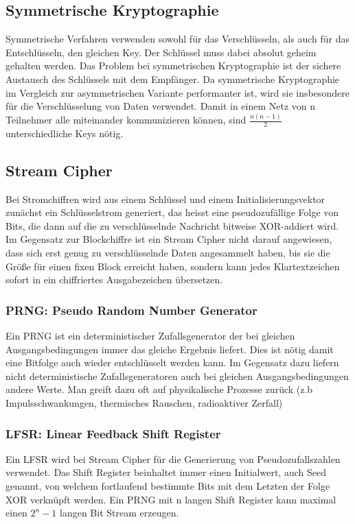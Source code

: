 \subsection{Symmetrische Kryptographie}
Symmetrische Verfahren verwenden sowohl für das Verschlüsseln, als auch für das Entschlüsseln, den gleichen 
Key. Der Schlüssel muss dabei absolut geheim gehalten werden. Das Problem bei symmetrischen Kryptographie ist der sichere Austausch des Schlüssels mit dem Empfänger. Da symmetrische Kryptographie im Vergleich zur asymmetrischen Variante performanter ist, wird sie insbesondere für die Verschlüsselung von Daten verwendet. Damit in einem Netz von n Teilnehmer alle miteinander kommunizieren können, sind $\frac{n(n-1)}{2}$ unterschiedliche Keys nötig. 

\subsection{Stream Cipher}
Bei Stromchiffren wird aus einem Schlüssel und einem Initialisierungsvektor zunächst ein Schlüsselstrom
generiert, das heisst eine pseudozufällige Folge von Bits, die dann auf die zu verschlüsselnde Nachricht bitweise XOR-addiert wird. Im Gegensatz zur Blockchiffre ist ein Stream Cipher nicht darauf angewiesen, dass sich erst genug zu verschlüsselnde Daten angesammelt haben, bis sie die Größe für einen fixen Block erreicht haben, sondern kann jedes Klartextzeichen sofort in ein chiffriertes Ausgabezeichen übersetzen. 

\subsubsection{PRNG: Pseudo Random Number Generator}
Ein PRNG ist ein deterministischer Zufallsgenerator der bei gleichen Ausgangsbedingungen immer das gleiche Ergebnis liefert. Dies ist nötig damit eine Bitfolge auch wieder entschlüsselt werden kann. Im Gegensatz dazu liefern nicht deterministische Zufallsgeneratoren auch bei gleichen Ausgangsbedingungen andere Werte. Man greift dazu oft auf physikalische Prozesse zurück (z.b Impulsschwankungen, thermisches Rauschen, radioaktiver Zerfall)

\subsubsection{LFSR: Linear Feedback Shift Register}
Ein LFSR wird bei Stream Cipher für die Generierung von Pseudozufallszahlen verwendet. Das Shift Register beinhaltet immer einen Initialwert, auch Seed genannt, von welchem fortlaufend bestimmte Bits mit dem Letzten der Folge XOR verknüpft werden. Ein PRNG mit n langen Shift Register kann maximal einen $2^n - 1$ langen Bit Stream erzeugen.

